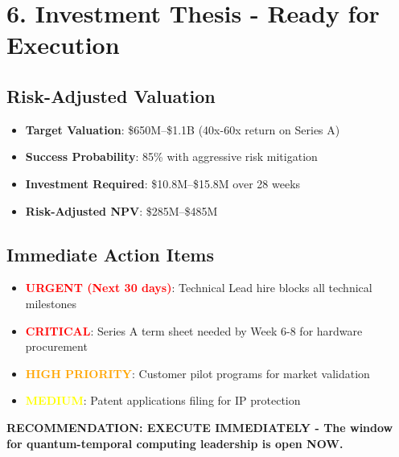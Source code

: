 \documentclass{article}
\begin{document}
\section*{6. Investment Thesis - Ready for Execution}

\subsection*{Risk-Adjusted Valuation}
\begin{itemize}
    \item \textbf{Target Valuation}: \$650M--\$1.1B (40x-60x return on Series A)
    \item \textbf{Success Probability}: 85\% with aggressive risk mitigation
    \item \textbf{Investment Required}: \$10.8M--\$15.8M over 28 weeks
    \item \textbf{Risk-Adjusted NPV}: \$285M--\$485M
\end{itemize}

\subsection*{Immediate Action Items}
\begin{itemize}
    \item \textcolor{red}{\textbf{URGENT (Next 30 days)}}: Technical Lead hire blocks all technical milestones
    \item \textcolor{red}{\textbf{CRITICAL}}: Series A term sheet needed by Week 6-8 for hardware procurement
    \item \textcolor{orange}{\textbf{HIGH PRIORITY}}: Customer pilot programs for market validation
    \item \textcolor{yellow}{\textbf{MEDIUM}}: Patent applications filing for IP protection
\end{itemize}

\textbf{RECOMMENDATION: EXECUTE IMMEDIATELY - The window for quantum-temporal computing leadership is open NOW.}
\end{document}
